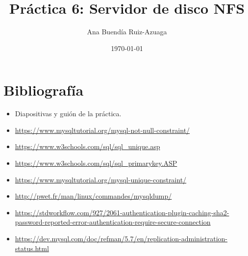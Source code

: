 \documentclass[twoside,openright,titlepage,numbers=noenddot,openany,headinclude,footinclude=true,
cleardoublepage=empty,abstractoff,BCOR=5mm,paper=a4,fontsize=12pt,main=spanish]{scrreprt}
\author{Ana Buendía Ruiz-Azuaga}
\date{\today}
\title{Práctica 6: Servidor de disco NFS}
\begin{document}
\maketitle
\tableofcontents

%




%


%


%






\chapter{Bibliografía}
\begin{itemize}
\item Diapositivas y guión de la práctica.
\item \href{https://www.mysqltutorial.org/mysql-not-null-constraint/}{https://www.mysqltutorial.org/mysql-not-null-constraint/}
\item \href{https://www.w3schools.com/sql/sql_unique.asp}{https://www.w3schools.com/sql/sql\_unique.asp}
\item \href{https://www.w3schools.com/sql/sql_primarykey.ASP}{https://www.w3schools.com/sql/sql\_primarykey.ASP}
\item \href{https://www.mysqltutorial.org/mysql-unique-constraint/}{https://www.mysqltutorial.org/mysql-unique-constraint/}
\item \href{http://pwet.fr/man/linux/commandes/mysqldump/}{http://pwet.fr/man/linux/commandes/mysqldump/}
\item \href{https://stdworkflow.com/927/2061-authentication-plugin-caching-sha2-password-reported-error-authentication-require-secure-connection}{https://stdworkflow.com/927/2061-authentication-plugin-caching-sha2-password-reported-error-authentication-require-secure-connection}
\item \href{https://dev.mysql.com/doc/refman/5.7/en/replication-administration-status.html}{https://dev.mysql.com/doc/refman/5.7/en/replication-administration-status.html}

\end{itemize}

%
\end{document}
